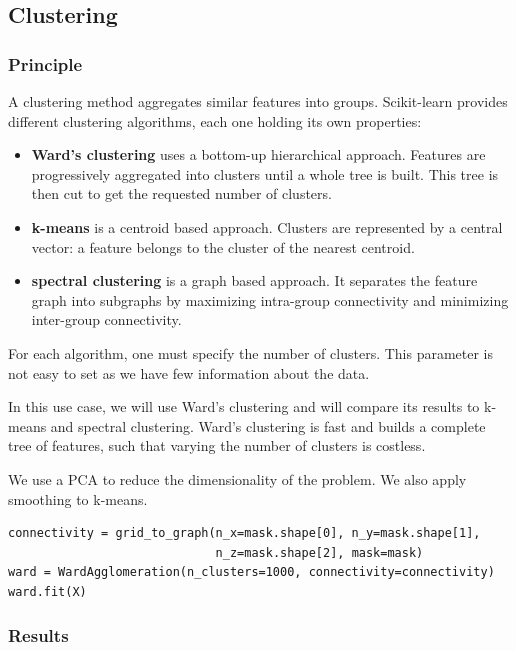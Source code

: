 \documentclass{frontiersSCNS} %
\newcommand{\alex}[1]{\todo[inline, color=green!40]{#1}}
\begin{document}
\alex{MELODIC is missing}

\subsection{Clustering}

\subsubsection{Principle}

A clustering method aggregates similar features into groups. Scikit-learn
provides different clustering algorithms, each one holding its own properties:

\begin{itemize}
    \item{\bf Ward's clustering} uses a bottom-up hierarchical approach. Features are
        progressively aggregated into clusters until a whole tree is built. This
        tree is then cut to get the requested number of clusters.
    \item{\bf k-means} is a centroid based approach. Clusters are represented by
        a central vector: a feature belongs to the cluster of the nearest
        centroid.
    \item{\bf spectral clustering} is a graph based approach. It separates
        the feature graph into subgraphs by maximizing intra-group connectivity and
        minimizing inter-group connectivity.
\end{itemize}

For each algorithm, one must specify the number of clusters. This parameter is
not easy to set as we have few information about the data.

In this use case, we will use Ward's clustering and will compare its results to
k-means and spectral clustering. Ward's clustering is fast and builds a complete
tree of features, such that varying the number of clusters is costless.

We use a PCA to reduce the dimensionality of the problem. We also apply
smoothing to k-means.

\begin{lstlisting}
connectivity = grid_to_graph(n_x=mask.shape[0], n_y=mask.shape[1],
                             n_z=mask.shape[2], mask=mask)
ward = WardAgglomeration(n_clusters=1000, connectivity=connectivity)
ward.fit(X)
\end{lstlisting}

\subsubsection{Results}
\end{document}
